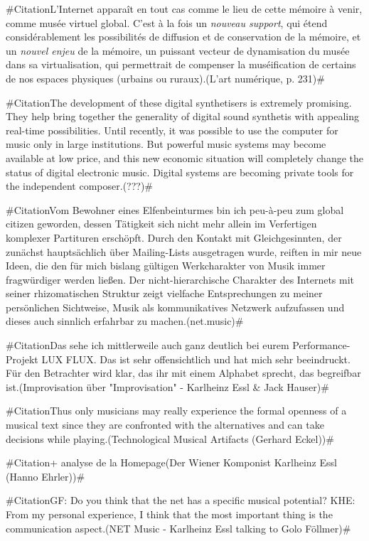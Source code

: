 \documentclass[a4paper,12pt]{article}
\newcommand{\zitat}[2]{\#Citation#1(#2)\#}
\begin{document}
\zitat{L'Internet apparaît en tout cas comme le lieu de cette mémoire à venir, comme musée virtuel global. C'est à la fois un \emph{nouveau support}, qui étend considérablement les possibilités de diffusion et de conservation de la mémoire, et un \emph{nouvel enjeu} de la mémoire, un puissant vecteur de dynamisation du musée dans sa virtualisation, qui permettrait de compenser la muséification de certains de nos espaces physiques (urbains ou ruraux).}
{L'art numérique, p. 231}

\zitat{The development of these digital synthetisers is extremely promising. They help bring together the generality of digital sound synthetis with appealing real-time possibilities. Until recently, it was possible to use the computer for music only in large institutions. But powerful music systems may become available at low price, and this new economic situation will completely change the status of digital electronic music. Digital systems are becoming private tools for the independent composer.}
{???}

\zitat{Vom Bewohner eines Elfenbeinturmes bin ich peu-à-peu zum global citizen geworden, dessen Tätigkeit sich nicht mehr allein im Verfertigen komplexer Partituren erschöpft. Durch den Kontakt mit Gleichgesinnten, der zunächst hauptsächlich über Mailing-Lists ausgetragen wurde, reiften in mir neue Ideen, die den für mich bislang gültigen Werkcharakter von Musik immer fragwürdiger werden ließen.
Der nicht-hierarchische Charakter des Internets mit seiner rhizomatischen Struktur zeigt vielfache Entsprechungen zu meiner persönlichen Sichtweise, Musik als kommunikatives Netzwerk aufzufassen und dieses auch sinnlich erfahrbar zu machen.}
{net.music}

\zitat{Das sehe ich mittlerweile auch ganz deutlich bei eurem Performance-Projekt LUX FLUX. Das ist sehr offensichtlich und hat mich sehr beeindruckt. Für den Betrachter wird klar, das ihr mit einem Alphabet sprecht, das begreifbar ist.}
{Improvisation über "Improvisation" - Karlheinz Essl \& Jack Hauser}

\zitat{Thus only musicians may really experience the formal openness of a musical text since they are confronted with the alternatives and can take decisions while playing.}
{Technological Musical Artifacts (Gerhard Eckel)}

\zitat{+ analyse de la Homepage}
{Der Wiener Komponist Karlheinz Essl (Hanno Ehrler)}

\zitat{GF: Do you think that the net has a specific musical potential? KHE: From my personal experience, I think that the most important thing is the communication aspect.}
{NET Music - Karlheinz Essl talking to Golo Föllmer}
\end{document}

